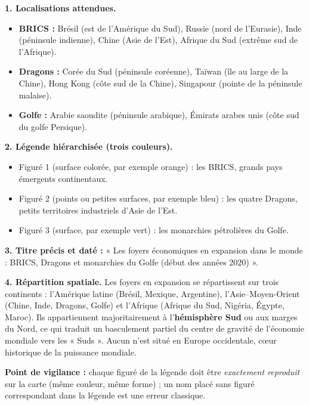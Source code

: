 \documentclass[11pt]{article}
\begin{document}
\begin{corrige}
\textbf{1. Localisations attendues.}
\begin{itemize}
\item \textbf{BRICS :} Brésil (est de l'Amérique du Sud), Russie (nord de l'Eurasie), Inde (péninsule indienne), Chine (Asie de l'Est), Afrique du Sud (extrême sud de l'Afrique).
\item \textbf{Dragons :} Corée du Sud (péninsule coréenne), Taïwan (île au large de la Chine), Hong Kong (côte sud de la Chine), Singapour (pointe de la péninsule malaise).
\item \textbf{Golfe :} Arabie saoudite (péninsule arabique), Émirats arabes unis (côte sud du golfe Persique).
\end{itemize}

\textbf{2. Légende hiérarchisée (trois couleurs).}
\begin{itemize}
\item Figuré 1 (surface colorée, par exemple orange) : les BRICS, grands pays émergents continentaux.
\item Figuré 2 (points ou petites surfaces, par exemple bleu) : les quatre Dragons, petits territoires industriels d'Asie de l'Est.
\item Figuré 3 (surface, par exemple vert) : les monarchies pétrolières du Golfe.
\end{itemize}

\textbf{3. Titre précis et daté :} « Les foyers économiques en expansion dans le monde : BRICS, Dragons et monarchies du Golfe (début des années 2020) ».

\textbf{4. Répartition spatiale.} Les foyers en expansion se répartissent sur trois continents : l'Amérique latine (Brésil, Mexique, Argentine), l'Asie--Moyen-Orient (Chine, Inde, Dragons, Golfe) et l'Afrique (Afrique du Sud, Nigéria, Égypte, Maroc). Ils appartiennent majoritairement à l'\textbf{hémisphère Sud} ou aux marges du Nord, ce qui traduit un basculement partiel du centre de gravité de l'économie mondiale vers les « Suds ». Aucun n'est situé en Europe occidentale, cœur historique de la puissance mondiale.

\textbf{Point de vigilance :} chaque figuré de la légende doit être \emph{exactement reproduit} sur la carte (même couleur, même forme) ; un nom placé sans figuré correspondant dans la légende est une erreur classique.
\end{corrige}
\end{document}
